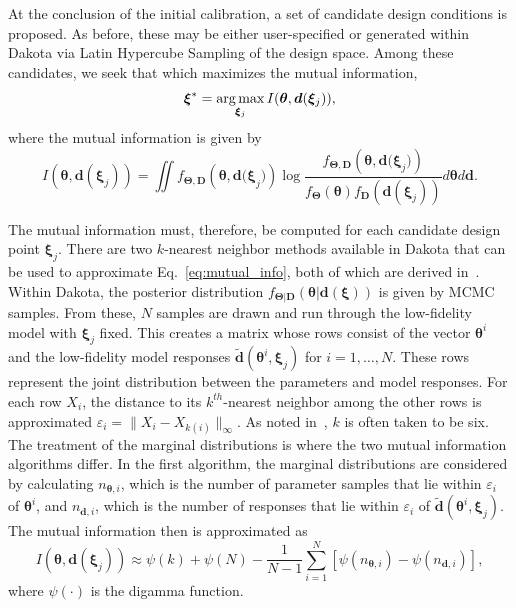 At the conclusion of the initial calibration, a set of candidate design
conditions is proposed. As before, these may be either user-specified or
generated within Dakota via Latin Hypercube Sampling of the design space. Among
these candidates, we seek that which maximizes the mutual information,
\begin{equation}
\boldsymbol{\xi}^{*} = \operatorname*{arg\,max}_{\boldsymbol{\xi}_{j}} I(\boldsymbol{\theta},
\boldsymbol{d}(\boldsymbol{\xi}_{j}) ),
\label{eq:optimal_design}
\end{equation}
where the mutual information is given by
\begin{equation}
I(\boldsymbol{\theta}, \boldsymbol{d}(\boldsymbol{\xi}_{j})) = \iint 
{f_{\boldsymbol{\Theta ,D}}}\left( \boldsymbol{\theta ,d(\xi}_{j}) \right)
\log \frac{ {f_{\boldsymbol{\Theta,D}}}\left( \boldsymbol{\theta,d(\xi}_{j}) 
\right)}{f_{\boldsymbol{\Theta}}\left(\boldsymbol{\theta} \right) 
f_{\boldsymbol{D}}\left(\boldsymbol{d}(\boldsymbol{\xi}_{j}) \right) }
d\boldsymbol{\theta} d\boldsymbol{d}.
\label{eq:mutual_info}
\end{equation}

The mutual information must, therefore, be computed for each candidate design 
point $\boldsymbol{\xi}_{j}$. There are two $k$-nearest neighbor methods 
available in Dakota that can be used to approximate Eq.~\ref{eq:mutual_info}, 
both of which are derived in~\cite{Kra04}. Within Dakota, the posterior 
distribution 
$f_{\boldsymbol{\Theta | D}}\left(\boldsymbol{\theta | d(\xi)}\right)$ is given
by MCMC samples. From these, $N$ samples are drawn and run through the
low-fidelity model with $\boldsymbol{\xi}_{j}$ fixed. This creates a matrix 
whose rows consist of the vector $\boldsymbol{\theta}^{i}$ and the low-fidelity
model responses $\tilde{\boldsymbol{d}}(\boldsymbol{\theta}^{i}, 
\boldsymbol{\xi}_{j})$ for $i = 1, \ldots, N$. These rows 
represent the joint distribution between the parameters and model responses. 
For each row $X_{i}$, the distance to its $k^{th}$-nearest neighbor among the 
other rows is approximated $\varepsilon_{i} = \| X_{i} - X_{k(i)} \|_{\infty}$. 
As noted in~\cite{Lew16}, $k$ is often taken to be six. The treatment of the 
marginal distributions is where the two mutual information algorithms differ. 
In the first algorithm, the marginal distributions are considered by 
calculating $n_{\boldsymbol{\theta},i}$, which is the number of parameter 
samples that lie within $\varepsilon_{i}$ of $\boldsymbol{\theta}^{i}$, and 
$n_{\boldsymbol{d},i}$, which is the number of responses that lie within 
$\varepsilon_{i}$ of $\tilde{\boldsymbol{d}}(\boldsymbol{\theta}^{i}, 
\boldsymbol{\xi}_{j})$. The mutual information then is approximated 
as~\cite{Kra04}
\begin{equation}
\label{eq:ksg1}
I(\boldsymbol{\theta}, \boldsymbol{d}(\boldsymbol{\xi}_{j})) \approx
\psi(k) + \psi(N) - \frac{1}{N-1} \sum_{i = 1}^{N} \left[ 
\psi(n_{\boldsymbol{\theta},i}) - \psi(n_{\boldsymbol{d},i}) \right],
\end{equation}
where $\psi(\cdot)$ is the digamma function. 

